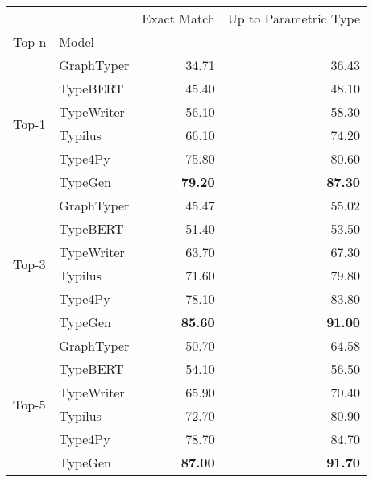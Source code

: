 \begin{tabular}{llrr}
\toprule
 &  & Exact Match & Up to Parametric Type \\
Top-n & Model &  &  \\
\midrule
\multirow[c]{6}{*}{Top-1} & GraphTyper & 34.71 & 36.43 \\
\cline{2-4}
 & TypeBERT & 45.40 & 48.10 \\
 & TypeWriter & 56.10 & 58.30 \\
 & Typilus & 66.10 & 74.20 \\
 & Type4Py & 75.80 & 80.60 \\
 & TypeGen & \bfseries 79.20 & \bfseries 87.30 \\
\cline{1-4}
\multirow[c]{6}{*}{Top-3} & GraphTyper & 45.47 & 55.02 \\
\cline{2-4}
 & TypeBERT & 51.40 & 53.50 \\
 & TypeWriter & 63.70 & 67.30 \\
 & Typilus & 71.60 & 79.80 \\
 & Type4Py & 78.10 & 83.80 \\
 & TypeGen & \bfseries 85.60 & \bfseries 91.00 \\
\cline{1-4}
\multirow[c]{6}{*}{Top-5} & GraphTyper & 50.70 & 64.58 \\
\cline{2-4}
 & TypeBERT & 54.10 & 56.50 \\
 & TypeWriter & 65.90 & 70.40 \\
 & Typilus & 72.70 & 80.90 \\
 & Type4Py & 78.70 & 84.70 \\
 & TypeGen & \bfseries 87.00 & \bfseries 91.70 \\
\cline{1-4}
\bottomrule
\end{tabular}

